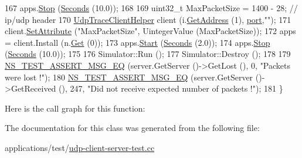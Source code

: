 \begin{DoxyCode}
167   apps.\hyperlink{classns3_1_1ApplicationContainer_adfc52f9aa4020c8714679b00bbb9ddb3}{Stop} (\hyperlink{group__timecivil_ga33c34b816f8ff6628e33d5c8e9713b9e}{Seconds} (10.0));
168 
169   uint32\_t MaxPacketSize = 1400 - 28; \textcolor{comment}{// ip/udp header}
170   \hyperlink{classns3_1_1UdpTraceClientHelper}{UdpTraceClientHelper} client (i.\hyperlink{classns3_1_1Ipv4InterfaceContainer_ae63208dcd222be986822937ee4aa828c}{GetAddress} (1), 
      \hyperlink{dsdv-manet_8cc_a8e0798404bf2cf5dabb84c5ba9a4f236}{port},\textcolor{stringliteral}{""});
171   client.\hyperlink{classns3_1_1UdpTraceClientHelper_a738dfc5345069f11cb944aeff10dfbdd}{SetAttribute} (\textcolor{stringliteral}{"MaxPacketSize"}, UintegerValue (MaxPacketSize));
172   apps = client.Install (n.\hyperlink{classns3_1_1NodeContainer_a9ed96e2ecc22e0f5a3d4842eb9bf90bf}{Get} (0));
173   apps.\hyperlink{classns3_1_1ApplicationContainer_a8eff87926507020bbe3e1390358a54a7}{Start} (\hyperlink{group__timecivil_ga33c34b816f8ff6628e33d5c8e9713b9e}{Seconds} (2.0));
174   apps.\hyperlink{classns3_1_1ApplicationContainer_adfc52f9aa4020c8714679b00bbb9ddb3}{Stop} (\hyperlink{group__timecivil_ga33c34b816f8ff6628e33d5c8e9713b9e}{Seconds} (10.0));
175 
176   Simulator::Run ();
177   Simulator::Destroy ();
178 
179   \hyperlink{group__testing_ga2a9d78cffb3db8e867c35fff0b698cf5}{NS\_TEST\_ASSERT\_MSG\_EQ} (server.GetServer ()->GetLost (), 0, \textcolor{stringliteral}{"Packets were lost !"});
180   \hyperlink{group__testing_ga2a9d78cffb3db8e867c35fff0b698cf5}{NS\_TEST\_ASSERT\_MSG\_EQ} (server.GetServer ()->GetReceived (), 247, \textcolor{stringliteral}{"Did not receive
       expected number of packets !"});
181 \}
\end{DoxyCode}


Here is the call graph for this function\+:




The documentation for this class was generated from the following file\+:\begin{DoxyCompactItemize}
\item 
applications/test/\hyperlink{udp-client-server-test_8cc}{udp-\/client-\/server-\/test.\+cc}\end{DoxyCompactItemize}

